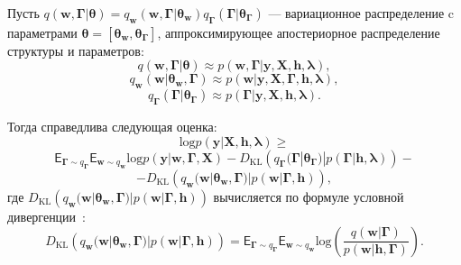 \begin{theorem}
Пусть $q(\mathbf{w},\boldsymbol{\Gamma}|\boldsymbol{\theta})  = q_\mathbf{w}(\mathbf{w},\boldsymbol{\Gamma}|\boldsymbol{\theta}_\mathbf{w})q_{\boldsymbol{\Gamma}}(\boldsymbol{\Gamma}|\boldsymbol{\theta}_{\boldsymbol{\Gamma}})$ --- вариационное распределение c параметрами $\boldsymbol{\theta}= [\boldsymbol{\theta}_\mathbf{w},\boldsymbol{\theta}_{\boldsymbol{\Gamma}} ]$, аппроксимирующее апостериорное распределение структуры и параметров:
\[
    q(\mathbf{w},\boldsymbol{\Gamma}|\boldsymbol{\theta}) \approx p(\mathbf{w},\boldsymbol{\Gamma}|\mathbf{y}, \mathbf{X}, \mathbf{h}, \boldsymbol{\lambda}),
\]
\[
    q_{\mathbf{w}}(\mathbf{w}|\boldsymbol{\theta}_\mathbf{w},\boldsymbol{\Gamma}) \approx p(\mathbf{w}|\mathbf{y}, \mathbf{X},  \boldsymbol{\Gamma},\mathbf{h}, \boldsymbol{\lambda}),
\]
\[
    q_{\boldsymbol{\Gamma}}(\boldsymbol{\Gamma}|\boldsymbol{\theta}_{\boldsymbol{\Gamma}}) \approx p(\boldsymbol{\Gamma}|\mathbf{y}, \mathbf{X},  \mathbf{h}, \boldsymbol{\lambda}).
\]

Тогда справедлива следующая оценка:
\begin{equation}
\label{eq:full_elbo}
\text{log} p(\mathbf{y}|\mathbf{X}, \mathbf{h}, \boldsymbol{\lambda}) \geq
\end{equation}
\[
 \mathsf{E}_{\boldsymbol{\Gamma} \sim q_{\boldsymbol{\Gamma}}}\mathsf{E}_{\mathbf{w} \sim q_{\mathbf{w}}} \text{log}p(\mathbf{y}|\mathbf{w}, \boldsymbol{\Gamma}, \mathbf{X})-D_\text{KL}\left(q_{\boldsymbol{\Gamma}}(\boldsymbol{\Gamma}|\boldsymbol{\theta}_{\boldsymbol{\Gamma}})|p(\boldsymbol{\Gamma}|\mathbf{h}, \boldsymbol{\lambda})\right) -
\]
\[
-D_\text{KL}\left(q_{\mathbf{w}}(\mathbf{w}|\boldsymbol{\theta}_\mathbf{w},\boldsymbol{\Gamma})|p(\mathbf{w}|\boldsymbol{\Gamma}, \mathbf{h})\right),
\]
где $D_\text{KL}\left(q_{\mathbf{w}}(\mathbf{w}|\boldsymbol{\theta}_\mathbf{w},\boldsymbol{\Gamma})|p(\mathbf{w}|\boldsymbol{\Gamma}, \mathbf{h})\right)$ вычисляется по формуле условной дивергенции~\cite{TODO}:
\[
D_\text{KL}\left(q_{\mathbf{w}}(\mathbf{w}|\boldsymbol{\theta}_\mathbf{w},\boldsymbol{\Gamma})|p(\mathbf{w}|\boldsymbol{\Gamma}, \mathbf{h})\right) = \mathsf{E}_{\boldsymbol{\Gamma} \sim q_{\boldsymbol{\Gamma}}} \mathsf{E}_{\mathbf{w} \sim q_{\mathbf{w}}} \text{log}\left(\frac{q(\mathbf{w}|\boldsymbol{\Gamma})}{p(\mathbf{w}|\mathbf{h},\boldsymbol{\Gamma})}\right).
\]
\end{theorem}

